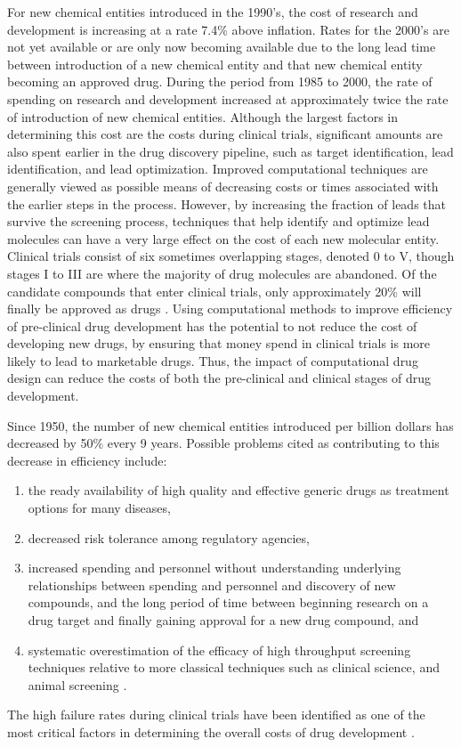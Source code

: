 For new chemical entities introduced in the 1990's, the cost of research and development is increasing at a rate 7.4\% above inflation.
Rates for the 2000's are not yet available or are only now becoming available due to the long lead time between introduction of a new chemical entity and that new chemical entity becoming an approved drug.
During the period from 1985 to 2000, the rate of spending on research and development increased at approximately twice the rate of introduction of new chemical entities.
Although the largest factors in determining this cost are the costs during clinical trials, significant amounts are also spent earlier in the drug discovery pipeline, such as target identification, lead identification, and lead optimization.
Improved computational techniques are generally viewed as possible means of decreasing costs or times associated with the earlier steps in the process.
However, by increasing the fraction of leads that survive the screening process, techniques that help identify and optimize lead molecules can have a very large effect on the cost of each new molecular entity.
Clinical trials consist of six sometimes overlapping stages, denoted 0 to V, though stages I to III are where the majority of drug molecules are abandoned.
Of the candidate compounds that enter clinical trials, only approximately 20\% will finally be approved as drugs \cite{dimasi2003price}.
Using computational methods to improve efficiency of pre-clinical drug development has the potential to not reduce the cost of developing new drugs, by ensuring that money spend in clinical trials is more likely to lead to marketable drugs.
Thus, the impact of computational drug design can reduce the costs of both the pre-clinical and clinical stages of drug development.  

Since 1950, the number of new chemical entities introduced per billion dollars has decreased by 50\% every 9 years.
Possible problems cited as contributing to this decrease in efficiency include:
\begin{enumerate}
 \item the ready availability of high quality and effective generic drugs as treatment options for many diseases,
 \item decreased risk tolerance among regulatory agencies,
 \item increased spending and personnel without understanding underlying relationships between spending and personnel and discovery of new compounds, and the long period of time between beginning research on a drug target and finally gaining approval for a new drug compound, and
 \item systematic overestimation of the efficacy of high throughput screening techniques relative to more classical techniques such as clinical science, and animal screening \cite{scannell2012diagnosing}.
\end{enumerate}

The high failure rates during clinical trials have been identified as one of the most critical factors in determining the overall costs of drug development \cite{bleicher2003hit}.

